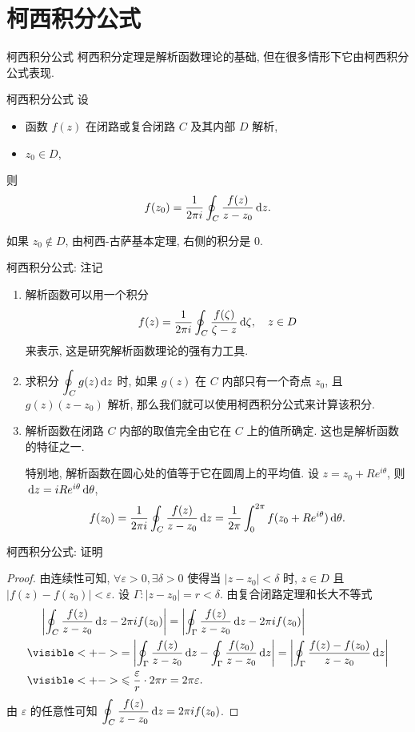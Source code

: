\section{柯西积分公式}


\begin{frame}{柯西积分公式}
\onslide<+->
柯西积分定理是解析函数理论的基础, 但在很多情形下它由柯西积分公式表现.
\begin{block}{柯西积分公式}
设
\begin{itemize}[<*>]
\item 函数 $f(z)$ 在闭路或复合闭路 $C$ 及其内部 $D$ 解析,
\item $z_0\in D$,
\end{itemize}
\onslide<+->
则
\[f(z_0)=\frac1{2\pi i}\oint_C\frac{f(z)}{z-z_0}\,\mathrm{d} z.\]
\end{block}
\onslide<+->
如果 $z_0\notin D$, 由柯西-古萨基本定理, 右侧的积分是 $0$.
\end{frame}


\begin{frame}{柯西积分公式: 注记}
\begin{enumerate}
\item 解析函数可以用一个积分
\[f(z)=\frac1{2\pi i}\oint_C\frac{f(\zeta)}{\zeta-z}\,\mathrm{d}\zeta,\quad z\in D\]
来表示, 这是研究解析函数理论的强有力工具.
\item 求积分 $\displaystyle\oint_C g(z)\,\mathrm{d} z$ 时, 如果 $g(z)$ 在 $C$ 内部只有一个奇点 $z_0$, 且 $g(z)(z-z_0)$ 解析, 那么我们就可以使用柯西积分公式来计算该积分.
\item 解析函数在闭路 $C$ 内部的取值完全由它在 $C$ 上的值所确定. 这也是解析函数的特征之一.

\onslide<+->
\indent
特别地, 解析函数在圆心处的值等于它在圆周上的平均值.
\onslide<+->
设 $z=z_0+Re^{i\theta}$, 则 $\,\mathrm{d} z=iRe^{i\theta}\,\mathrm{d}\theta$,
\onslide<+->
\[f(z_0)=\frac1{2\pi i}\oint_C\frac{f(z)}{z-z_0}\,\mathrm{d} z=\frac1{2\pi}\int_0^{2\pi}f(z_0+Re^{i\theta})\,\mathrm{d}\theta.\]
\end{enumerate}
\end{frame}


\begin{frame}{柯西积分公式: 证明}
\begin{proof}
由连续性可知, $\forall\varepsilon>0,\exists\delta>0$ 使得当 $|z-z_0|<\delta$ 时, $z\in D$ 且 $|f(z)-f(z_0)|<\varepsilon$.
\onslide<+->
设 $\Gamma:|z-z_0|=r<\delta$.
\onslide<+->
由复合闭路定理和长大不等式
\begin{align*}
&\peq\abs{\oint_C\frac{f(z)}{z-z_0}\diff z-2\pi i f(z_0)}
=\abs{\oint_\Gamma\frac{f(z)}{z-z_0}\diff z-2\pi i f(z_0)}\\
&\visible<+->{=\abs{\oint_\Gamma\frac{f(z)}{z-z_0}\diff z-\oint_\Gamma\frac{f(z_0)}{z-z_0}\diff z}
=\abs{\oint_\Gamma\frac{f(z)-f(z_0)}{z-z_0}\diff z}}\\
&\visible<+->{\le \frac\varepsilon r\cdot 2\pi r=2\pi \varepsilon.}
\end{align*}
\onslide<+->
由 $\varepsilon$ 的任意性可知 $\displaystyle\oint_C\frac{f(z)}{z-z_0}\,\mathrm{d} z=2\pi i f(z_0)$.
\end{proof}
\end{frame}



